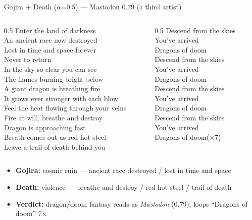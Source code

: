 \documentclass[aspectratio=169]{beamer}
\begin{document}
\begin{frame}{Gojira + Death ($\alpha$=0.5) --- \textcolor{accent}{Mastodon 0.79 (a third artist)}}
  \scriptsize\itshape\raggedright
  \begin{columns}[T]
    \begin{column}{0.5\textwidth}
      Enter the land of darkness\\
      An ancient race now destroyed\\
      Lost in time and space forever\\
      Never to return\\[4pt]
      In the sky so clear you can see\\
      The flames burning bright below\\
      A giant dragon is breathing fire\\
      It grows ever stronger with each blow\\[4pt]
      Feel the heat flowing through your veins\\
      Fire at will, breathe and destroy\\
      Dragon is approaching fast\\
      Breath comes out as red hot steel\\
      Leave a trail of death behind you
    \end{column}
    \begin{column}{0.5\textwidth}
      Descend from the skies\\
      You've arrived\\
      Dragons of doom\\[3pt]
      Descend from the skies\\
      You've arrived\\
      Dragons of doom\\[3pt]
      Descend from the skies\\
      You've arrived\\
      Dragons of doom\\[3pt]
      Descend from the skies\\
      You've arrived\\
      Dragons of doom\quad\upshape\footnotesize($\times$7)
    \end{column}
  \end{columns}
  \upshape\vskip3pt\footnotesize
  \begin{itemize}\setlength{\itemsep}{1pt}
    \item \textbf{Gojira:} cosmic ruin --- ancient race destroyed / lost in time and space
    \item \textbf{Death:} violence --- breathe and destroy / red hot steel / trail of death
    \item \textcolor{accent}{\textbf{Verdict:} dragon/doom fantasy reads as \emph{Mastodon} (0.79), loops ``Dragons of doom'' 7$\times$}
  \end{itemize}
\end{frame}
\end{document}

